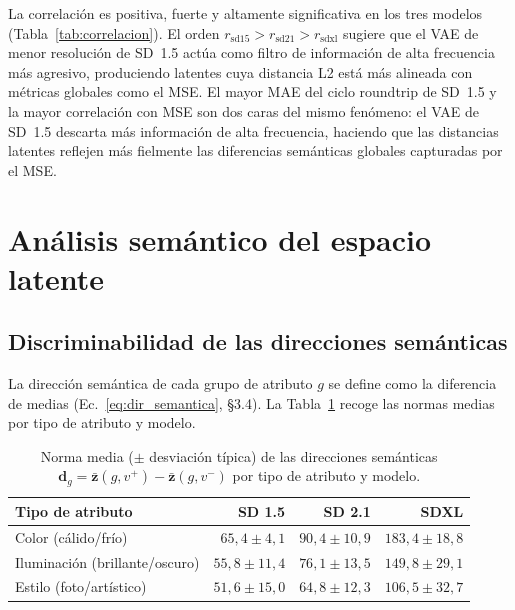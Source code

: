 \documentclass[12pt, a4paper, twoside]{book}
\newcommand{\z}{\mathbf{z}}
\begin{document}
La correlación es positiva, fuerte y altamente significativa en los tres modelos
(Tabla~\ref{tab:correlacion}). El orden $r_{\text{sd15}} > r_{\text{sd21}} > r_{\text{sdxl}}$
sugiere que el VAE de menor resolución de SD~1.5 actúa como filtro de información de alta
frecuencia más agresivo, produciendo latentes cuya distancia L2 está más alineada con
métricas globales como el MSE. El mayor MAE del ciclo roundtrip de SD~1.5 y la mayor
correlación con MSE son dos caras del mismo fenómeno: el VAE de SD~1.5 descarta más
información de alta frecuencia, haciendo que las distancias latentes reflejen más fielmente
las diferencias semánticas globales capturadas por el MSE.

\section{Análisis semántico del espacio latente}
\label{sec:res:semantico}

\subsection{Discriminabilidad de las direcciones semánticas}
\label{subsec:res:discriminabilidad}

La dirección semántica de cada grupo de atributo $g$ se define como la diferencia de medias
(Ec.~\ref{eq:dir_semantica}, §3.4). La Tabla~\ref{tab:normas_dir} recoge las normas medias
por tipo de atributo y modelo.

\begin{table}[htb]
\centering
\caption{Norma media ($\pm$ desviación típica) de las direcciones semánticas
$\mathbf{d}_g = \bar{\z}(g,v^+) - \bar{\z}(g,v^-)$ por tipo de atributo y modelo.}
\label{tab:normas_dir}
\small
\begin{tabular}{lrrr}
\toprule
\textbf{Tipo de atributo} & \textbf{SD 1.5} & \textbf{SD 2.1} & \textbf{SDXL} \\
\midrule
Color (cálido/frío)            & $65{,}4 \pm 4{,}1$  & $90{,}4 \pm 10{,}9$ & $183{,}4 \pm 18{,}8$ \\
Iluminación (brillante/oscuro) & $55{,}8 \pm 11{,}4$ & $76{,}1 \pm 13{,}5$ & $149{,}8 \pm 29{,}1$ \\
Estilo (foto/artístico)        & $51{,}6 \pm 15{,}0$ & $64{,}8 \pm 12{,}3$ & $106{,}5 \pm 32{,}7$ \\
\bottomrule
\end{tabular}
\end{table}
\end{document}

